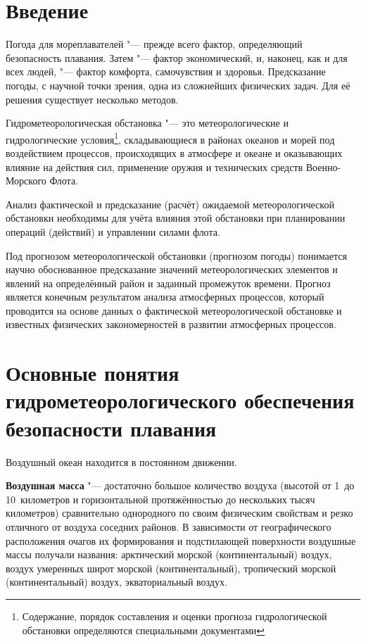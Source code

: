 \documentclass[a4paper, 12pt, twoside, draft, book, russian, fittopage, cyremdash, openright]{ncc}
\begin{document}


\frontmatter

\openrightorany

{\small \tableofcontents}
{\small \listoffigures}
{\small \listoftables}

\openrightorany

\chapter*{Введение}

Погода для мореплавателей "--- прежде всего фактор, определяющий
безопасность плавания. Затем "--- фактор экономический, и, наконец,
как и для всех людей, "--- фактор комфорта, самочувствия и
здоровья. Предсказание погоды, с научной точки зрения, одна из
сложнейших физических задач. Для её решения существует несколько
методов.

Гидрометеорологическая обстановка "--- это метеорологические и
гидрологические условия\footnote{Содержание, порядок составления и
  оценки прогноза гидрологической обстановки определяются специальными
  документами}, складывающиеся в районах океанов и морей под
воздействием процессов, происходящих в атмосфере и океане и
оказывающих влияние на действия сил, применение оружия и технических
средств Военно-Морского Флота.

Анализ фактической и предсказание (расчёт) ожидаемой метеорологической
обстановки необходимы для учёта влияния этой обстановки при
планировании операций (действий) и управлении силами флота.

Под прогнозом метеорологической обстановки (прогнозом погоды)
понимается научно обоснованное предсказание значений метеорологических
элементов и явлений на определённый район и заданный промежуток
времени. Прогноз является конечным результатом анализа атмосферных
процессов, который проводится на основе данных о фактической
метеорологической обстановке и известных физических закономерностей в
развитии атмосферных процессов.

\mainmatter

\chapter{Основные понятия гидрометеорологического обеспечения безопасности плавания}

Воздушный океан находится в постоянном движении.

\textbf{Воздушная масса} "--- достаточно
большое количество воздуха (высотой от 1~до 10~километров и
горизонтальной протяжённостью до нескольких тысяч километров)
сравнительно однородного по своим физическим свойствам и резко
отличного от воздуха соседних районов. В зависимости от
географического расположения очагов их формирования и подстилающей
поверхности воздушные массы получали названия: арктический морской
(континентальный) воздух, воздух умеренных широт морской
(континентальный), тропический морской (континентальный) воздух,
экваториальный воздух.
\end{document}
